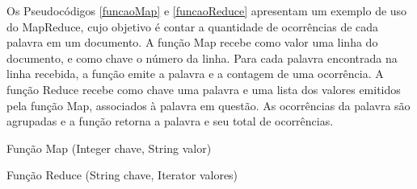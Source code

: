 Os Pseudocódigos \ref{funcaoMap} e \ref{funcaoReduce} apresentam um exemplo de uso do MapReduce, cujo objetivo é contar a quantidade de ocorrências de cada palavra em um documento. A função Map recebe como valor uma linha do documento, e como chave o número da linha. Para cada palavra encontrada na linha recebida, a função emite a palavra e a contagem de uma ocorrência. A função Reduce recebe como chave uma palavra e uma lista dos valores emitidos pela função Map, associados à palavra em questão. As ocorrências da palavra são agrupadas e a função retorna a palavra e seu total de ocorrências.


\SetAlCapSkip{0.6cm}

\begin{algorithm}	
\DontPrintSemicolon
	\caption{Função Map (Integer chave, String valor)}\label{funcaoMap}
\end{algorithm}

\begin{algorithm}	 
\DontPrintSemicolon
	\caption{Função Reduce (String chave, Iterator valores)}\label{funcaoReduce}
\end{algorithm}


